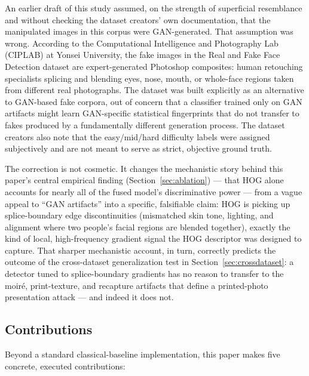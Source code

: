 \documentclass[11pt]{article}
\begin{document}
An earlier draft of this study assumed, on the strength of superficial resemblance and without checking the dataset creators' own documentation, that the manipulated images in this corpus were GAN-generated. That assumption was wrong. According to the Computational Intelligence and Photography Lab (CIPLAB) at Yonsei University, the fake images in the Real and Fake Face Detection dataset are expert-generated Photoshop composites: human retouching specialists splicing and blending eyes, nose, mouth, or whole-face regions taken from different real photographs. The dataset was built explicitly as an alternative to GAN-based fake corpora, out of concern that a classifier trained only on GAN artifacts might learn GAN-specific statistical fingerprints that do not transfer to fakes produced by a fundamentally different generation process. The dataset creators also note that the easy/mid/hard difficulty labels were assigned subjectively and are not meant to serve as strict, objective ground truth.

The correction is not cosmetic. It changes the mechanistic story behind this paper's central empirical finding (Section~\ref{sec:ablation}) --- that HOG alone accounts for nearly all of the fused model's discriminative power --- from a vague appeal to ``GAN artifacts'' into a specific, falsifiable claim: HOG is picking up splice-boundary edge discontinuities (mismatched skin tone, lighting, and alignment where two people's facial regions are blended together), exactly the kind of local, high-frequency gradient signal the HOG descriptor was designed to capture. That sharper mechanistic account, in turn, correctly predicts the outcome of the cross-dataset generalization test in Section~\ref{sec:crossdataset}: a detector tuned to splice-boundary gradients has no reason to transfer to the moir\'e, print-texture, and recapture artifacts that define a printed-photo presentation attack --- and indeed it does not.

\subsection{Contributions}

Beyond a standard classical-baseline implementation, this paper makes five concrete, executed contributions:
\end{document}
